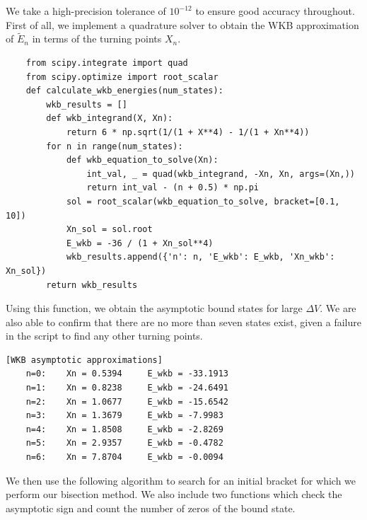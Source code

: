\documentclass{article}
\begin{document}
We take a high-precision tolerance of \(10^{-12}\) to ensure good accuracy throughout. First of all, we implement a quadrature solver to obtain the WKB approximation of \(\widetilde{E}_n\) in terms of the turning points \(X_n\).

\begin{verbatim}
    from scipy.integrate import quad
    from scipy.optimize import root_scalar
    def calculate_wkb_energies(num_states):
        wkb_results = []
        def wkb_integrand(X, Xn):
            return 6 * np.sqrt(1/(1 + X**4) - 1/(1 + Xn**4))
        for n in range(num_states):
            def wkb_equation_to_solve(Xn):
                int_val, _ = quad(wkb_integrand, -Xn, Xn, args=(Xn,))
                return int_val - (n + 0.5) * np.pi
            sol = root_scalar(wkb_equation_to_solve, bracket=[0.1, 10])
            Xn_sol = sol.root
            E_wkb = -36 / (1 + Xn_sol**4)
            wkb_results.append({'n': n, 'E_wkb': E_wkb, 'Xn_wkb': Xn_sol})
        return wkb_results
\end{verbatim}

Using this function, we obtain the asymptotic bound states for large \(\Delta V\). We are also able to confirm that there are no more than seven states exist, given a failure in the script to find any other turning points.

\begin{verbatim}[WKB asymptotic approximations]
    n=0:    Xn = 0.5394     E_wkb = -33.1913
    n=1:    Xn = 0.8238     E_wkb = -24.6491
    n=2:    Xn = 1.0677     E_wkb = -15.6542
    n=3:    Xn = 1.3679     E_wkb = -7.9983
    n=4:    Xn = 1.8508     E_wkb = -2.8269
    n=5:    Xn = 2.9357     E_wkb = -0.4782
    n=6:    Xn = 7.8704     E_wkb = -0.0094
\end{verbatim}

We then use the following algorithm to search for an initial bracket for which we perform our bisection method. We also include two functions which check the asymptotic sign and count the number of zeros of the bound state.
\end{document}
